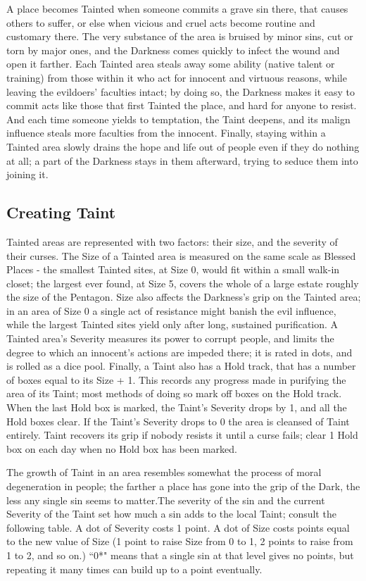 A place becomes Tainted when someone commits a grave sin there, that causes others to suffer, or else when vicious and cruel acts become routine and customary there. The very substance of the area is bruised by minor sins, cut or torn by major ones, and the Darkness comes quickly to infect the wound and open it farther. Each Tainted area steals away some ability (native talent or training) from those within it who act for innocent and virtuous reasons, while leaving the evildoers' faculties intact; by doing so, the Darkness makes it easy to commit acts like those that first Tainted the place, and hard for anyone to resist. And each time someone yields to temptation, the Taint deepens, and its malign influence steals more faculties from the innocent. Finally, staying within a Tainted area slowly drains the hope and life out of people even if they do nothing at all; a part of the Darkness stays in them afterward, trying to seduce them into joining it.

\subsection*{Creating Taint}

Tainted areas are represented with two factors: their size, and the severity of their curses. The Size of a Tainted area is measured on the same scale as Blessed Places - the smallest Tainted sites, at Size 0, would fit within a small walk-in closet; the largest ever found, at Size 5, covers the whole of a large estate roughly the size of the Pentagon. Size also affects the Darkness's grip on the Tainted area; in an area of Size 0 a single act of resistance might banish the evil influence, while the largest Tainted sites yield only after long, sustained purification. A Tainted area's Severity measures its power to corrupt people, and limits the degree to which an innocent's actions are impeded there; it is rated in dots, and is rolled as a dice pool. Finally, a Taint also has a Hold track, that has a number of boxes equal to its Size + 1. This records any progress made in purifying the area of its Taint; most methods of doing so mark off boxes on the Hold track. When the last Hold box is marked, the Taint's 
Severity drops by 1, and all the Hold boxes clear. If the Taint's Severity drops to 0 the area is cleansed of Taint entirely. Taint recovers its grip if nobody resists it until a curse fails; clear 1 Hold box on each day when no Hold box has been marked.

The growth of Taint in an area resembles somewhat the process of moral degeneration in people; the farther a place has gone into the grip of the Dark, the less any single sin seems to matter.The severity of the sin and the current Severity of the Taint set how much a sin adds to the local Taint; consult the following table. A dot of Severity costs 1 point. A dot of Size costs points equal to the new value of Size (1 point to raise Size from 0 to 1, 2 points to raise from 1 to 2, and so on.) \textquotedblleft 0*" means that a single sin at that level gives no points, but repeating it many times can build up to a point eventually.

